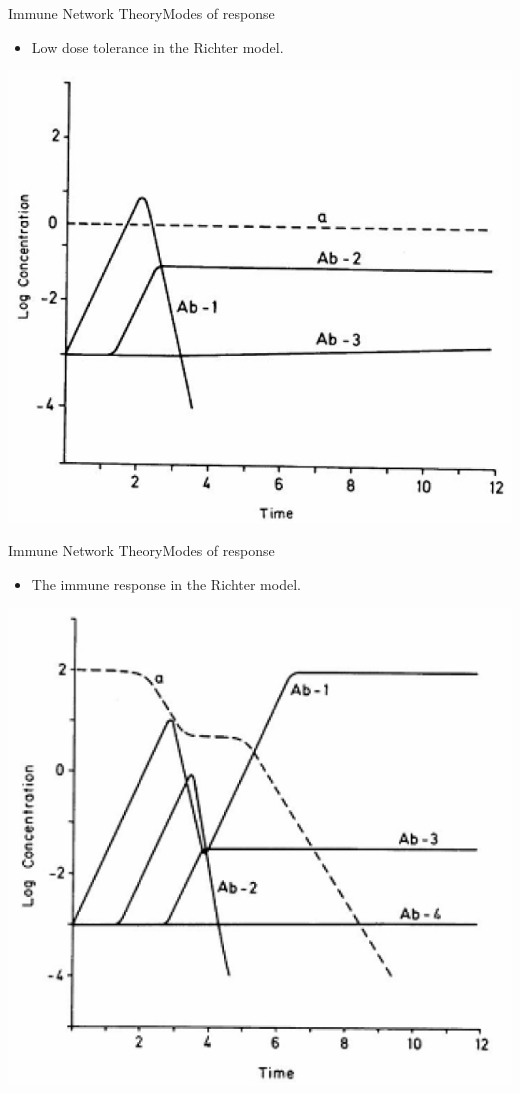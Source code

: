 \begin{frame}{Immune Network Theory}{Modes of response}
  \begin{itemize}
  \item \large
     Low dose tolerance in the Richter model.
  \end{itemize}
  \par
  \centering
    \includegraphics[scale=0.5] {img/low_dose_tolerance.png}
  \par
\end{frame}

\begin{frame}{Immune Network Theory}{Modes of response}
  \begin{itemize}
  \item \large
     The immune response in the Richter model.
  \end{itemize}
  \par
  \centering
    \includegraphics[scale=0.5] {img/immune_response.png}
  \par
\end{frame}

